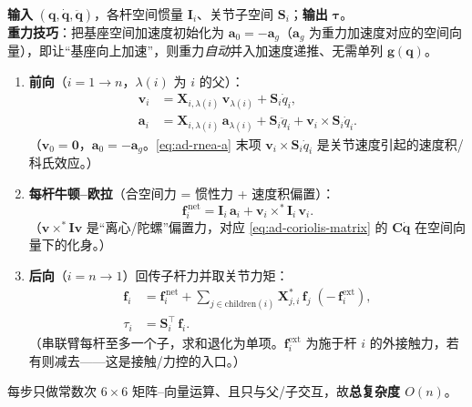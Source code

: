 \begin{algo}
\label{alg:ad-rnea}
\textbf{输入} $(\mathbf{q},\dot{\mathbf{q}},\ddot{\mathbf{q}})$，各杆空间惯量 $\mathbf{I}_i$、关节子空间 $\mathbf{S}_i$；\textbf{输出} $\boldsymbol{\tau}$。\\
\textbf{重力技巧}：把基座空间加速度初始化为 $\mathbf{a}_0=-\mathbf{a}_g$（$\mathbf{a}_g$ 为重力加速度对应的空间向量），即让“基座向上加速”，则重力\emph{自动}并入加速度递推、无需单列 $\mathbf{g}(\mathbf{q})$\cite{lynch2017modern,featherstone2008rbda}。
\begin{enumerate}
  \item \textbf{前向}（$i=1\to n$，$\lambda(i)$ 为 $i$ 的父）：
  \begin{align}
    \mathbf{v}_i&=\mathbf{X}_{i,\lambda(i)}\,\mathbf{v}_{\lambda(i)}+\mathbf{S}_i\dot{q}_i, \label{eq:ad-rnea-v}\\
    \mathbf{a}_i&=\mathbf{X}_{i,\lambda(i)}\,\mathbf{a}_{\lambda(i)}+\mathbf{S}_i\ddot{q}_i+\mathbf{v}_i\times\mathbf{S}_i\dot{q}_i. \label{eq:ad-rnea-a}
  \end{align}
  （$\mathbf{v}_0=\mathbf{0}$，$\mathbf{a}_0=-\mathbf{a}_g$。\cref{eq:ad-rnea-a} 末项 $\mathbf{v}_i\times\mathbf{S}_i\dot{q}_i$ 是关节速度引起的速度积/科氏效应。）
  \item \textbf{每杆牛顿--欧拉}（合空间力 = 惯性力 + 速度积偏置）：
  \begin{equation}
    \mathbf{f}_i^{\,\mathrm{net}}=\mathbf{I}_i\,\mathbf{a}_i+\mathbf{v}_i\times^{*}\mathbf{I}_i\,\mathbf{v}_i. \label{eq:ad-rnea-fnet}
  \end{equation}
  （$\mathbf{v}\times^*\mathbf{I}\mathbf{v}$ 是“离心/陀螺”偏置力，对应 \cref{eq:ad-coriolis-matrix} 的 $\mathbf{C}\dot{\mathbf{q}}$ 在空间向量下的化身。）
  \item \textbf{后向}（$i=n\to1$）回传子杆力并取关节力矩：
  \begin{align}
    \mathbf{f}_i&=\mathbf{f}_i^{\,\mathrm{net}}+\!\!\sum_{j\in\text{children}(i)}\!\!\mathbf{X}^{*}_{j,i}\,\mathbf{f}_j\;(-\,\mathbf{f}_i^{\mathrm{ext}}), \label{eq:ad-rnea-f}\\
    \tau_i&=\mathbf{S}_i^\top\,\mathbf{f}_i. \label{eq:ad-rnea-tau}
  \end{align}
  （串联臂每杆至多一个子，求和退化为单项。$\mathbf{f}_i^{\mathrm{ext}}$ 为施于杆 $i$ 的外接触力，若有则减去——这是接触/力控的入口。）
\end{enumerate}
每步只做常数次 $6\times6$ 矩阵--向量运算、且只与父/子交互，故\textbf{总复杂度 $O(n)$}。
\end{algo}

